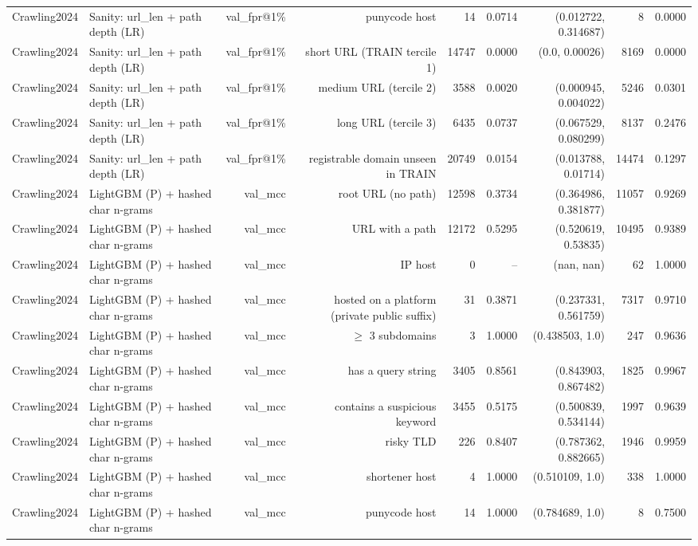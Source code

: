 \begin{table}[t]
\begin{tabular}{llrrrrrrr}
Crawling2024 & Sanity: url\_len + path depth (LR) & val\_fpr@1\% & punycode host & 14 & 0.0714 & (0.012722, 0.314687) & 8 & 0.0000 \\
Crawling2024 & Sanity: url\_len + path depth (LR) & val\_fpr@1\% & short URL (TRAIN tercile 1) & 14747 & 0.0000 & (0.0, 0.00026) & 8169 & 0.0000 \\
Crawling2024 & Sanity: url\_len + path depth (LR) & val\_fpr@1\% & medium URL (tercile 2) & 3588 & 0.0020 & (0.000945, 0.004022) & 5246 & 0.0301 \\
Crawling2024 & Sanity: url\_len + path depth (LR) & val\_fpr@1\% & long URL (tercile 3) & 6435 & 0.0737 & (0.067529, 0.080299) & 8137 & 0.2476 \\
Crawling2024 & Sanity: url\_len + path depth (LR) & val\_fpr@1\% & registrable domain unseen in TRAIN & 20749 & 0.0154 & (0.013788, 0.01714) & 14474 & 0.1297 \\
Crawling2024 & LightGBM (P) + hashed char n-grams & val\_mcc & root URL (no path) & 12598 & 0.3734 & (0.364986, 0.381877) & 11057 & 0.9269 \\
Crawling2024 & LightGBM (P) + hashed char n-grams & val\_mcc & URL with a path & 12172 & 0.5295 & (0.520619, 0.53835) & 10495 & 0.9389 \\
Crawling2024 & LightGBM (P) + hashed char n-grams & val\_mcc & IP host & 0 & -- & (nan, nan) & 62 & 1.0000 \\
Crawling2024 & LightGBM (P) + hashed char n-grams & val\_mcc & hosted on a platform (private public suffix) & 31 & 0.3871 & (0.237331, 0.561759) & 7317 & 0.9710 \\
Crawling2024 & LightGBM (P) + hashed char n-grams & val\_mcc & $\geq$ 3 subdomains & 3 & 1.0000 & (0.438503, 1.0) & 247 & 0.9636 \\
Crawling2024 & LightGBM (P) + hashed char n-grams & val\_mcc & has a query string & 3405 & 0.8561 & (0.843903, 0.867482) & 1825 & 0.9967 \\
Crawling2024 & LightGBM (P) + hashed char n-grams & val\_mcc & contains a suspicious keyword & 3455 & 0.5175 & (0.500839, 0.534144) & 1997 & 0.9639 \\
Crawling2024 & LightGBM (P) + hashed char n-grams & val\_mcc & risky TLD & 226 & 0.8407 & (0.787362, 0.882665) & 1946 & 0.9959 \\
Crawling2024 & LightGBM (P) + hashed char n-grams & val\_mcc & shortener host & 4 & 1.0000 & (0.510109, 1.0) & 338 & 1.0000 \\
Crawling2024 & LightGBM (P) + hashed char n-grams & val\_mcc & punycode host & 14 & 1.0000 & (0.784689, 1.0) & 8 & 0.7500 \\

\end{tabular}
\end{table}

